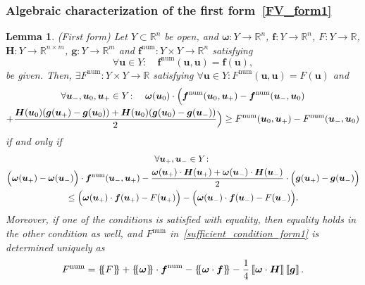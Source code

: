 \documentclass[]{scrartcl}
\newcommand*{\ldblbrace}{\{\mskip-5mu \left \{}
\newcommand*{\rdblbrace}{ \}\mskip-5mu \right \}}
\newcommand{\mean}[1]{\left\ldblbrace #1 \right\rdblbrace}
\renewcommand{\vec}[1]{\boldsymbol{#1}}
\newcommand{\jump}[1]{\left\llbracket #1  \right\rrbracket}
\newtheorem{lemma}[theorem]{Lemma}
\theoremstyle{definition}
\begin{document}
\subsubsection{Algebraic characterization of the first form\texorpdfstring{~\eqref{FV_form1}}{}}

\begin{lemma}{\label{algebraic_lemma_nc_form1}(First form)}
Let $Y \subset \mathbb{R}^n$ be open, and $\vec{\omega}\colon Y \to \mathbb{R}^n$, $\vec{f}\colon Y \to \mathbb{R}^n$, $F\colon Y \to \mathbb{R}$, $\vec{H}\colon Y \to \mathbb{R}^{n \times m}$, $\vec{g}\colon Y \to \mathbb{R}^m$ and $\vec{f}^{\mathrm{num}}\colon Y \times Y \to \mathbb{R}^n$  satisfying
\begin{equation}
\forall \vec{u} \in Y\colon \quad \vec{f}^\mathrm{num}(\vec{u},\vec{u}) = \vec{f}(\vec{u}),
\end{equation}
be given. Then,
$\exists F^\mathrm{num}\colon Y \times Y \to \mathbb{R}$ satisfying $\forall \vec{u}\in Y\colon F^\mathrm{num}(\vec{u},\vec{u}) = F(\vec{u})$ and
\begin{multline}
    \forall \vec{u}_-, \vec{u}_0, \vec{u}_+ \in Y\colon \quad \vec{\omega}(\vec{u}_0) \cdot \Bigl (  \vec{f}^\mathrm{num}(\vec{u}_0, \vec{u}_+) - \vec{f}^\mathrm{num}(\vec{u}_-, \vec{u}_0) \\+ \frac{\vec{H} (\vec{u}_0)  (\vec{g}(\vec{u}_+) - \vec{g}(\vec{u}_0) ) + \vec{H}(\vec{u}_0)  (\vec{g}(  \vec{u}_0) - \vec{g}(\vec{u}_-)  )}{2} \Bigr ) \geq F^\mathrm{num}(\vec{u}_0, \vec{u}_+) - F^\mathrm{num}(\vec{u}_-, \vec{u}_0)
    \label{sufficient_condition_form1}
\end{multline}
if and only if
\begin{multline}
    \forall \vec{u}_+, \vec{u}_- \in Y\colon
    \\
    \Bigl (\vec{\omega}(\vec{u}_+) - \vec{\omega}(\vec{u}_-) \Bigr )
    \cdot \vec{f}^\mathrm{num}(\vec{u}_-, \vec{u}_+)
    - \frac{\vec{\omega}(\vec{u}_+) \cdot \vec{H}(\vec{u}_+) + \vec{\omega}(\vec{u}_-) \cdot \vec{H}(\vec{u}_-)}{2}
    \cdot \Bigl ( \vec{g}(\vec{u}_+) - \vec{g}(\vec{u}_-) \Bigr )
    \\
    \leq  \Bigl ( \vec{\omega}(\vec{u}_+) \cdot \vec{f}(\vec{u}_+) - F(\vec{u}_+) \Bigr ) - \Bigl (\vec{\omega}(\vec{u}_-) \cdot \vec{f}(\vec{u}_-) - F(\vec{u}_-) \Bigr ).
\label{necessary_condition_form1}
\end{multline}
Moreover, if one of the conditions is satisfied with equality, then equality holds in the other condition as well, and $F^{\mathrm{num}}$ in~\eqref{sufficient_condition_form1} is determined uniquely as
\begin{equation}
F^{\mathrm{num}} = \mean{F} + \mean{\vec{\omega}} \cdot \vec{f}^{\mathrm{num}}-\mean{\vec{\omega} \cdot \vec{f}}  - \frac{1}{4} \jump{\vec{\omega} \cdot \vec{H}} \jump{\vec{g}}.
\label{F_num_form1}
\end{equation}
\end{lemma}
\end{document}
